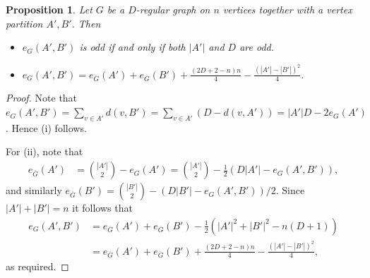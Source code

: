 \documentclass{memo-l}
\newtheorem{prop}[firstthm]{Proposition}
\def\COMMENT#1{}
\numberwithin{section}{chapter}
\numberwithin{equation}{section}
\numberwithin{firstthm}{section}
\numberwithin{figure}{section}
\begin{document}
\begin{prop} \label{prp:e(A',B')parity}
Let $G$ be a $D$-regular graph on $n$ vertices together with a vertex partition $A',B'$.
Then 
\begin{itemize}
\item[{\rm (i)}] $e_G(A',B')$ is odd if and only if both $|A'|$ and $D$ are odd. 
\item[{\rm (ii)}]%
$e_G(A', B')   = e_{\overline{G}}(A') +e_{\overline{G}}(B') + \frac{(2D+2-n)n}{4} - \frac{(|A'|-|B'|)^2}4.$
\end{itemize}
\end{prop}
\begin{proof}
Note that $e_G(A',B') = \sum_{v \in A'} d(v,B') = \sum_{v \in A'} (D - d(v,A')) = |A'| D - 2 e_G(A')$.
Hence (i) follows.

For (ii), note that
\begin{align*}
	e_{\overline{G}}(A') & =  \binom{|A'|}2 - e_G (A') = \binom{|A'|}2 - \frac12 \left( D |A'| - e_G(A',B') \right),
\end{align*}
and similarly $	e_{\overline{G}}(B')  = \binom{|B'|}2 - \left( D|B'|  - e_G(A',B')\right)/2$.
Since $|A'|+|B'|=n$ it follows that
\begin{align*}
	e_G(A',B') & = e_{\overline{G}}(A') + e_{\overline{G}}(B') - \frac12 \left( |A'|^2 +|B'|^2 -n \left( D + 1\right) \right)\\
	& = e_{\overline{G}}(A') + e_{\overline{G}}(B') + \frac{(2D +2 - n )n}{4} - \frac{(|A'|-|B'|)^2}{4},
\end{align*}
as required.%
    \COMMENT{To see the last equality we need to check that $\frac{|A'|^2+|B'|^2}{2}=\frac{n^2}{4}+\frac{(|A'|-|B'|)^2}{4}$
which holds since $\frac{n^2}{4}=\frac{(|A'|+|B'|)^2}{4}$.}
\end{proof}
\end{document}
